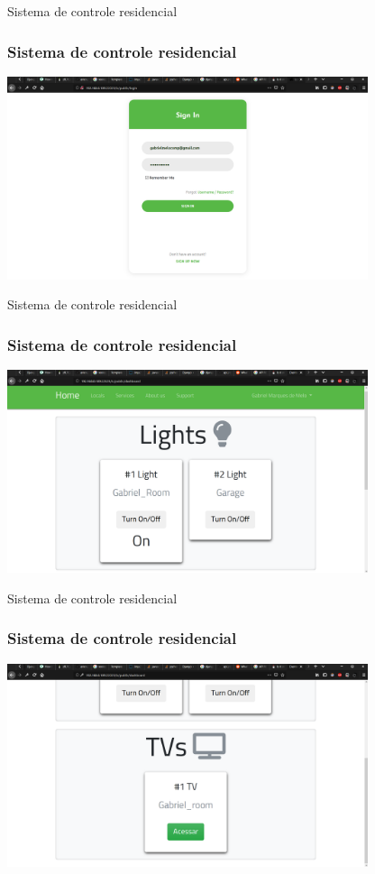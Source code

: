 \documentclass[10pt, compress]{beamer}
\begin{document}
\begin{frame}{Sistema de controle residencial}
  \frametitle{Sistema de controle residencial}
  \includegraphics[width=300pt]{images/iot-server_login.png}
\end{frame}

\begin{frame}{Sistema de controle residencial}
  \frametitle{Sistema de controle residencial}
  \includegraphics[width=300pt]{images/iot-server_dash1.png}
\end{frame}

\begin{frame}{Sistema de controle residencial}
  \frametitle{Sistema de controle residencial}
  \includegraphics[width=300pt]{images/iot-server_dash2.png}
\end{frame}
\end{document}

